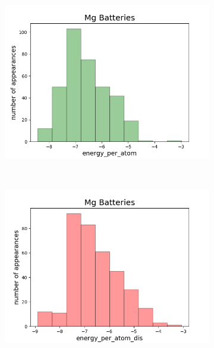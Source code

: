 \begin{figure}[h]
\begin{subfigure}{0.2\textwidth}
     \end{subfigure}
          ~ 
     \begin{subfigure}{0.2\textwidth}
         \centering
         \includegraphics[width=\linewidth]{result/figures/distribution/Mg_distrof_energy_per_atom.png}
         
     \end{subfigure}
     ~ 
     \begin{subfigure}{0.2\textwidth}
         \centering
         \includegraphics[width=\linewidth]{result/figures/distribution/Mg_distrof_energy_per_atom_dis.png}
         

\end{subfigure}
\end{figure}

